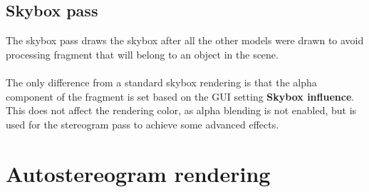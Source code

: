 \documentclass[12pt, a4paper]{article}
\begin{document}
\subsection{Skybox pass}
The skybox pass draws the skybox after all the other models were drawn to avoid processing fragment that will belong to an object
in the scene.\\\\
The only difference from a standard skybox rendering is that the alpha component of the fragment is set based
on the GUI setting \textbf{Skybox influence}. This does not affect the rendering color, as alpha blending is not enabled, but
is used for the stereogram pass to achieve some advanced effects.

\section{Autostereogram rendering}
\end{document}
